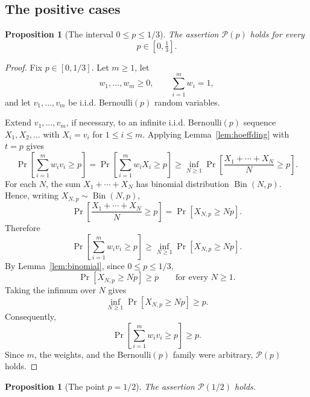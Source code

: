 \documentclass[12pt]{article}
\theoremstyle{definition}
\theoremstyle{plain}
\newtheorem{proposition}[definition]{Proposition}
\theoremstyle{remark}
\begin{document}
\subsection{The positive cases}

\begin{proposition}[The interval \(0\le p\le1/3\)]\label{prop:smallp}
The assertion \(\mathcal P(p)\) holds for every
\[
p\in[0,\tfrac13].
\]
\end{proposition}

\begin{proof}
Fix \(p\in[0,1/3]\). Let \(m\ge1\), let
\[
w_1,\ldots,w_m\ge0,\qquad \sum_{i=1}^{m}w_i=1,
\]
and let \(v_1,\ldots,v_m\) be i.i.d. Bernoulli\((p)\) random variables.

Extend \(v_1,\ldots,v_m\), if necessary, to an infinite i.i.d. Bernoulli\((p)\) sequence \(X_1,X_2,\ldots\) with \(X_i=v_i\) for \(1\le i\le m\). Applying Lemma~\ref{lem:hoeffding} with \(t=p\) gives
\[
\Pr\!\left[\sum_{i=1}^{m}w_i v_i\ge p\right]
=
\Pr\!\left[\sum_{i=1}^{m}w_i X_i\ge p\right]
\ge
\inf_{N\ge1}
\Pr\!\left[\frac{X_1+\cdots+X_N}{N}\ge p\right].
\]
For each \(N\), the sum \(X_1+\cdots+X_N\) has binomial distribution \(\operatorname{Bin}(N,p)\). Hence, writing \(X_{N,p}\sim\operatorname{Bin}(N,p)\),
\[
\Pr\!\left[\frac{X_1+\cdots+X_N}{N}\ge p\right]
=
\Pr[X_{N,p}\ge Np].
\]
Therefore
\[
\Pr\!\left[\sum_{i=1}^{m}w_i v_i\ge p\right]
\ge
\inf_{N\ge1}\Pr[X_{N,p}\ge Np].
\]
By Lemma~\ref{lem:binomial}, since \(0\le p\le1/3\),
\[
\Pr[X_{N,p}\ge Np]\ge p
\qquad\text{for every }N\ge1.
\]
Taking the infimum over \(N\) gives
\[
\inf_{N\ge1}\Pr[X_{N,p}\ge Np]\ge p.
\]
Consequently,
\[
\Pr\!\left[\sum_{i=1}^{m}w_i v_i\ge p\right]\ge p.
\]
Since \(m\), the weights, and the Bernoulli\((p)\) family were arbitrary, \(\mathcal P(p)\) holds.
\end{proof}

\begin{proposition}[The point \(p=1/2\)]\label{prop:halfp}
The assertion \(\mathcal P(1/2)\) holds.
\end{proposition}
\end{document}
